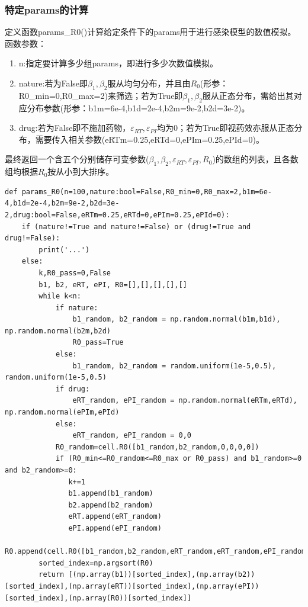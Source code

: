 \documentclass{ctexart}
\begin{document}
\subsubsection{特定params的计算}
定义函数params\_R0()计算给定条件下的params用于进行感染模型的数值模拟。函数参数：
\begin{enumerate}
    \item n:指定要计算多少组params，即进行多少次数值模拟。
    \item nature:若为False即$\beta_{1},\beta_{2}$服从均匀分布，并且由$R_{0}$(形参：R0\_min=0,R0\_max=2)来筛选；若为True即$\beta_{1},\beta_{2}$服从正态分布，需给出其对应分布参数(形参：b1m=6e-4,b1d=2e-4,b2m=9e-2,b2d=3e-2)。
    \item drug:若为False即不施加药物，$\varepsilon _{RT},\varepsilon _{PI}$均为0；若为True即视药效亦服从正态分布，需要传入相关参数(eRTm=0.25,eRTd=0,ePIm=0.25,ePId=0)。
\end{enumerate}
最终返回一个含五个分别储存可变参数($\beta_{1},\beta_{2},\varepsilon _{RT},\varepsilon _{PI},R_{0}$)的数组的列表，且各数组均根据$R_{0}$按从小到大排序。
\begin{lstlisting}[label={lst.5}, caption={特定params的计算}]
    def params_R0(n=100,nature:bool=False,R0_min=0,R0_max=2,b1m=6e-4,b1d=2e-4,b2m=9e-2,b2d=3e-2,drug:bool=False,eRTm=0.25,eRTd=0,ePIm=0.25,ePId=0):
    if (nature!=True and nature!=False) or (drug!=True and drug!=False):
        print('...')
    else:
        k,R0_pass=0,False
        b1, b2, eRT, ePI, R0=[],[],[],[],[]
        while k<n:
            if nature:
                b1_random, b2_random = np.random.normal(b1m,b1d), np.random.normal(b2m,b2d)
                R0_pass=True
            else:
                b1_random, b2_random = random.uniform(1e-5,0.5), random.uniform(1e-5,0.5)
            if drug:
                eRT_random, ePI_random = np.random.normal(eRTm,eRTd), np.random.normal(ePIm,ePId)
            else:
                eRT_random, ePI_random = 0,0
            R0_random=cell.R0([b1_random,b2_random,0,0,0,0])
            if (R0_min<=R0_random<=R0_max or R0_pass) and b1_random>=0 and b2_random>=0:
               k+=1
               b1.append(b1_random)
               b2.append(b2_random)
               eRT.append(eRT_random)
               ePI.append(ePI_random)
               R0.append(cell.R0([b1_random,b2_random,eRT_random,eRT_random,ePI_random,ePI_random]))
        sorted_index=np.argsort(R0)
        return [(np.array(b1))[sorted_index],(np.array(b2))[sorted_index],(np.array(eRT))[sorted_index],(np.array(ePI))[sorted_index],(np.array(R0))[sorted_index]]
\end{lstlisting}
\end{document}
